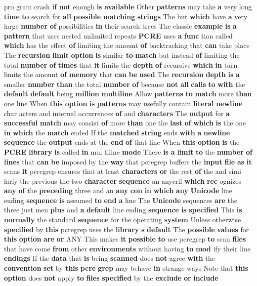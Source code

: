 pro gram crash {\bf if} {\bf not} enough {\bf is} {\bf available} Other {\bf patterns} may take {\bf a} very long {\bf time} {\bf to} search for {\bf all} {\bf possible} {\bf matching} {\bf strings} The but {\bf which} have {\bf a} very large {\bf number} {\bf of} possibilities {\bf in} their search trees The classic {\bf example} {\bf is} {\bf a} {\bf pattern} that uses nested unlimited repeats {\bf P\+C\+RE} uses {\bf a} {\bf func} tion called {\bf which} has the effect {\bf of} limiting the amount {\bf of} backtracking that {\bf can} take place The {\bf recursion} {\bf limit} {\bf option} {\bf is} similar {\bf to} {\bf match} but instead {\bf of} limiting the total {\bf number} {\bf of} {\bf times} that {\bf it} limits the {\bf depth} {\bf of} recursive {\bf which} {\bf in} turn limits the amount {\bf of} {\bf memory} that {\bf can} {\bf be} {\bf used} The {\bf recursion} {\bf depth} {\bf is} {\bf a} smaller {\bf number} {\bf than} the total {\bf number} {\bf of} because {\bf not} {\bf all} {\bf calls} {\bf to} {\bf with} the {\bf default} {\bf default} being {\bf million} {\bf multiline} Allow {\bf patterns} {\bf to} {\bf match} more {\bf than} one line When {\bf this} {\bf option} {\bf is} {\bf patterns} may usefully contain {\bf literal} {\bf newline} char acters and internal occurrences {\bf of} and {\bf characters} The {\bf output} for {\bf a} {\bf successful} {\bf match} may consist {\bf of} more {\bf than} one the {\bf last} {\bf of} {\bf which} {\bf is} the one {\bf in} {\bf which} the {\bf match} ended If the {\bf matched} {\bf string} ends {\bf with} {\bf a} {\bf newline} {\bf sequence} the {\bf output} ends at the {\bf end} {\bf of} that line When {\bf this} {\bf option} {\bf is} the {\bf P\+C\+RE} {\bf library} {\bf is} called {\bf in} mul tiline {\bf mode} There {\bf is} {\bf a} {\bf limit} {\bf to} the {\bf number} {\bf of} {\bf lines} that {\bf can} {\bf be} imposed by the {\bf way} that pcregrep buffers the {\bf input} {\bf file} {\bf as} {\bf it} scans {\bf it} pcregrep ensures that at least {\bf characters} {\bf or} the rest {\bf of} the and simi larly the previous the two {\bf character} {\bf sequence} an anycrlf {\bf which} {\bf rec} ognizes {\bf any} {\bf of} the {\bf preceding} three and an {\bf any} {\bf con} {\bf in} {\bf which} {\bf any} {\bf Unicode} line ending {\bf sequence} {\bf is} assumed {\bf to} {\bf end} {\bf a} line The {\bf Unicode} sequences {\bf are} the three just men {\bf plus} and {\bf a} {\bf default} line ending {\bf sequence} {\bf is} {\bf specified} This {\bf is} {\bf normally} the standard {\bf sequence} for the operating {\bf system} Unless otherwise {\bf specified} by {\bf this} pcregrep uses the {\bf library} {\bf s} {\bf default} The {\bf possible} {\bf values} for {\bf this} {\bf option} {\bf are} {\bf or} A\+NY This makes {\bf it} {\bf possible} {\bf to} use pcregrep {\bf to} scan {\bf files} that have come {\bf from} other {\bf environments} without having {\bf to} {\bf mod} ify their line {\bf endings} If the {\bf data} that {\bf is} being {\bf scanned} does {\bf not} agree {\bf with} the {\bf convention} {\bf set} by {\bf this} {\bf pcre} {\bf grep} may behave {\bf in} strange ways Note that {\bf this} {\bf option} does {\bf not} apply {\bf to} {\bf files} {\bf specified} by the {\bf exclude} {\bf or} {\bf include} 